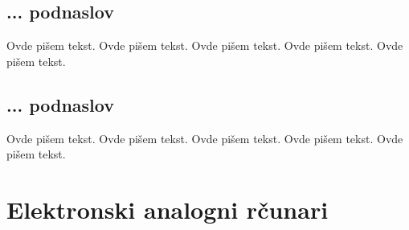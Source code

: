 \documentclass[a4paper]{article}
\begin{document}
{\subsection{... podnaslov}
\label{subsec:podnaslovK}

Ovde pišem tekst. 
Ovde pišem tekst. 
Ovde pišem tekst. 
Ovde pišem tekst. 
Ovde pišem tekst. 

\subsection{... podnaslov}
\label{subsec:podnaslovM}

Ovde pišem tekst. 
Ovde pišem tekst. 
Ovde pišem tekst. 
Ovde pišem tekst. 
Ovde pišem tekst. 

\section{Elektronski analogni r\v{c}unari}
		\label{sec:naslovM}

}
\end{document}
